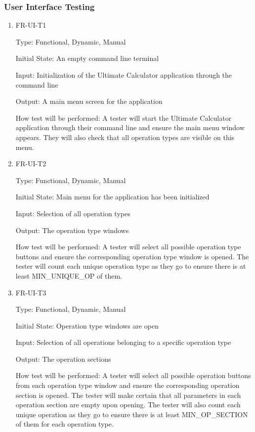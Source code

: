 \documentclass[12pt, titlepage]{article}
\begin{document}
\subsubsection{User Interface Testing}

\begin{enumerate}

\item{FR-UI-T1\\}

Type: Functional, Dynamic, Manual
					
Initial State: An empty command line terminal
					
Input: Initialization of the Ultimate Calculator application through the command line
					
Output: A main menu screen for the application
					
How test will be performed: A tester will start the Ultimate Calculator application through their command line and ensure the main menu window appears. They will also check that all operation types are visible on this menu.
					
\item{FR-UI-T2\\}

Type: Functional, Dynamic, Manual
					
Initial State: Main menu for the application has been initialized
					
Input: Selection of all operation types
					
Output: The operation type windows
					
How test will be performed: A tester will select all possible operation type buttons and ensure the corresponding operation type window is opened. The tester will count each unique operation type as they go to ensure there is at least MIN\_UNIQUE\_OP of them.

\item{FR-UI-T3\\}

Type: Functional, Dynamic, Manual
					
Initial State: Operation type windows are open
					
Input: Selection of all operations belonging to a specific operation type
					
Output: The operation sections
					
How test will be performed: A tester will select all possible operation buttons from each operation type window and ensure the corresponding operation section is opened. The tester will make certain that all parameters in each operation section are empty upon opening. The tester will also count each unique operation as they go to ensure there is at least MIN\_OP\_SECTION of them for each operation type.



\end{enumerate}
\end{document}
